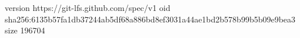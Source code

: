 version https://git-lfs.github.com/spec/v1
oid sha256:6135b57fa1db37244ab5df68a886bd8ef3031a44ae1bd2b578b99b5b09e9bea3
size 196704
